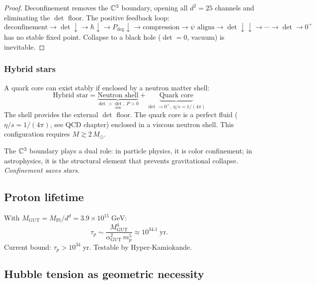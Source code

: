 \begin{proof}
Deconfinement removes the $\mathbb{C}^3$ boundary, opening all $d^2 = 25$ channels and eliminating the $\det$ floor. The positive feedback loop:
\begin{equation}
\text{deconfinement} \to \det\!\downarrow \to \hbar\!\downarrow \to P_\text{deg}\!\downarrow \to \text{compression} \to \psi\text{ aligns} \to \det\!\downarrow\!\downarrow \to \cdots \to \det \to 0^+
\end{equation}
has no stable fixed point. Collapse to a black hole ($\det = 0$, vacuum) is inevitable.
\end{proof}

\subsubsection{Hybrid stars}

A quark core can exist stably if enclosed by a neutron matter shell:
\begin{equation}
\text{Hybrid star} = \underbrace{\text{Neutron shell}}_{\det > \det_\text{min},\; P > 0} + \underbrace{\text{Quark core}}_{\det \to 0^+,\;\eta/s = 1/(4\pi)}
\end{equation}
The shell provides the external $\det$ floor. The quark core is a perfect fluid ($\eta/s = 1/(4\pi)$, see QCD chapter) enclosed in a viscous neutron shell. This configuration requires $M \gtrsim 2\,M_\odot$.

\begin{remark}
The $\mathbb{C}^3$ boundary plays a dual role: in particle physics, it is color confinement; in astrophysics, it is the structural element that prevents gravitational collapse. \emph{Confinement saves stars.}
\end{remark}

\subsection{Proton lifetime}

With $M_\text{GUT} = M_\text{Pl}/d^d = 3.9 \times 10^{15}\;\text{GeV}$:
\begin{equation}
\tau_p \sim \frac{M_\text{GUT}^4}{\alpha_\text{GUT}^2\,m_p^5} \approx 10^{34.1}\;\text{yr}.
\end{equation}
Current bound: $\tau_p > 10^{34}\;\text{yr}$. Testable by Hyper-Kamiokande.

\subsection{Hubble tension as geometric necessity}

